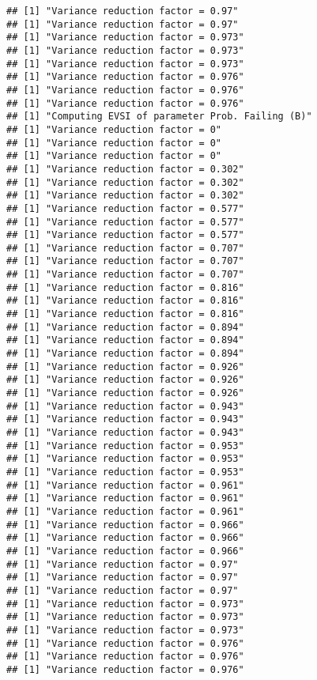 \documentclass[
]{article}
\begin{document}
\begin{verbatim}
## [1] "Variance reduction factor = 0.97"
## [1] "Variance reduction factor = 0.97"
## [1] "Variance reduction factor = 0.973"
## [1] "Variance reduction factor = 0.973"
## [1] "Variance reduction factor = 0.973"
## [1] "Variance reduction factor = 0.976"
## [1] "Variance reduction factor = 0.976"
## [1] "Variance reduction factor = 0.976"
## [1] "Computing EVSI of parameter Prob. Failing (B)"
## [1] "Variance reduction factor = 0"
## [1] "Variance reduction factor = 0"
## [1] "Variance reduction factor = 0"
## [1] "Variance reduction factor = 0.302"
## [1] "Variance reduction factor = 0.302"
## [1] "Variance reduction factor = 0.302"
## [1] "Variance reduction factor = 0.577"
## [1] "Variance reduction factor = 0.577"
## [1] "Variance reduction factor = 0.577"
## [1] "Variance reduction factor = 0.707"
## [1] "Variance reduction factor = 0.707"
## [1] "Variance reduction factor = 0.707"
## [1] "Variance reduction factor = 0.816"
## [1] "Variance reduction factor = 0.816"
## [1] "Variance reduction factor = 0.816"
## [1] "Variance reduction factor = 0.894"
## [1] "Variance reduction factor = 0.894"
## [1] "Variance reduction factor = 0.894"
## [1] "Variance reduction factor = 0.926"
## [1] "Variance reduction factor = 0.926"
## [1] "Variance reduction factor = 0.926"
## [1] "Variance reduction factor = 0.943"
## [1] "Variance reduction factor = 0.943"
## [1] "Variance reduction factor = 0.943"
## [1] "Variance reduction factor = 0.953"
## [1] "Variance reduction factor = 0.953"
## [1] "Variance reduction factor = 0.953"
## [1] "Variance reduction factor = 0.961"
## [1] "Variance reduction factor = 0.961"
## [1] "Variance reduction factor = 0.961"
## [1] "Variance reduction factor = 0.966"
## [1] "Variance reduction factor = 0.966"
## [1] "Variance reduction factor = 0.966"
## [1] "Variance reduction factor = 0.97"
## [1] "Variance reduction factor = 0.97"
## [1] "Variance reduction factor = 0.97"
## [1] "Variance reduction factor = 0.973"
## [1] "Variance reduction factor = 0.973"
## [1] "Variance reduction factor = 0.973"
## [1] "Variance reduction factor = 0.976"
## [1] "Variance reduction factor = 0.976"
## [1] "Variance reduction factor = 0.976"
\end{verbatim}
\end{document}
